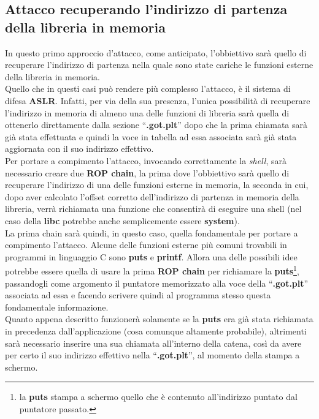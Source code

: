 \subsection*{Attacco recuperando l'indirizzo di partenza della libreria in memoria}
\label{subsec:Attack_3.2.1}
In questo primo approccio d'attacco, come anticipato, l'obbiettivo sarà quello di recuperare l'indirizzo di partenza nella quale sono state cariche le funzioni esterne della libreria in memoria.\\
Quello che in questi casi può rendere più complesso l'attacco, è il sistema di difesa \textbf{ASLR}. Infatti, per via della sua presenza, l'unica possibilità di recuperare l'indirizzo in memoria di almeno una delle funzioni di libreria sarà quella di ottenerlo direttamente dalla sezione ``\textbf{.got.plt}'' dopo che la prima chiamata sarà già stata effettuata e quindi la voce in tabella ad essa associata sarà già stata aggiornata con il suo indirizzo effettivo.\\
Per portare a compimento l'attacco, invocando correttamente la \textit{shell}, sarà necessario creare due \textbf{ROP chain}, la prima dove l'obbiettivo sarà quello di recuperare l'indirizzo di una delle funzioni esterne in memoria, la seconda in cui, dopo aver calcolato l'offset corretto dell'indirizzo di partenza in memoria della libreria, verrà richiamata una funzione che consentirà di eseguire una shell (nel caso della \textbf{libc} potrebbe anche semplicemente essere \textbf{system}).\\
La prima chain sarà quindi, in questo caso, quella fondamentale per portare a compimento l'attacco. Alcune delle funzioni esterne più comuni trovabili in programmi in linguaggio C sono \textbf{puts} e \textbf{printf}. Allora una delle possibili idee potrebbe essere quella di usare la prima \textbf{ROP chain} per richiamare la \textbf{puts}\footnote[1]{la \textbf{puts} stampa a schermo quello che è contenuto all'indirizzo puntato dal puntatore passato.}, passandogli come argomento il puntatore memorizzato alla voce della ``\textbf{.got.plt}'' 
associata ad essa e facendo scrivere quindi al programma stesso questa fondamentale informazione.\\
Quanto appena descritto funzionerà solamente se la \textbf{puts} era già stata richiamata in precedenza dall'applicazione (cosa comunque altamente probabile), altrimenti sarà necessario inserire una sua chiamata all'interno della catena, così da avere per certo il suo indirizzo effettivo nella ``\textbf{.got.plt}'', al momento della stampa a schermo.\\
